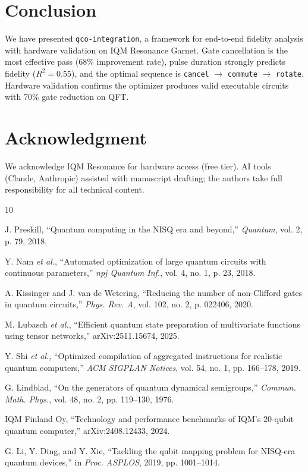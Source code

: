 \documentclass[journal]{IEEEtran}
\begin{document}
\section{Conclusion}

We have presented \texttt{qco-integration}, a framework for end-to-end fidelity analysis with hardware validation on IQM Resonance Garnet. Gate cancellation is the most effective pass (68\% improvement rate), pulse duration strongly predicts fidelity ($R^2 = 0.55$), and the optimal sequence is \texttt{cancel} $\rightarrow$ \texttt{commute} $\rightarrow$ \texttt{rotate}. Hardware validation confirms the optimizer produces valid executable circuits with 70\% gate reduction on QFT.

\section*{Acknowledgment}

We acknowledge IQM Resonance for hardware access (free tier). AI tools (Claude, Anthropic) assisted with manuscript drafting; the authors take full responsibility for all technical content.

\begin{thebibliography}{10}

J. Preskill, ``Quantum computing in the NISQ era and beyond,'' \textit{Quantum}, vol. 2, p. 79, 2018.

Y. Nam \textit{et al.}, ``Automated optimization of large quantum circuits with continuous parameters,'' \textit{npj Quantum Inf.}, vol. 4, no. 1, p. 23, 2018.

A. Kissinger and J. van de Wetering, ``Reducing the number of non-Clifford gates in quantum circuits,'' \textit{Phys. Rev. A}, vol. 102, no. 2, p. 022406, 2020.

M. Lubasch \textit{et al.}, ``Efficient quantum state preparation of multivariate functions using tensor networks,'' arXiv:2511.15674, 2025.

Y. Shi \textit{et al.}, ``Optimized compilation of aggregated instructions for realistic quantum computers,'' \textit{ACM SIGPLAN Notices}, vol. 54, no. 1, pp. 166--178, 2019.

G. Lindblad, ``On the generators of quantum dynamical semigroups,'' \textit{Commun. Math. Phys.}, vol. 48, no. 2, pp. 119--130, 1976.

IQM Finland Oy, ``Technology and performance benchmarks of IQM's 20-qubit quantum computer,'' arXiv:2408.12433, 2024.

G. Li, Y. Ding, and Y. Xie, ``Tackling the qubit mapping problem for NISQ-era quantum devices,'' in \textit{Proc. ASPLOS}, 2019, pp. 1001--1014.

\end{thebibliography}
\end{document}
